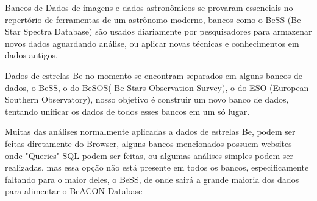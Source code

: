 Bancos de Dados de imagens e dados astronômicos se provaram essenciais no repertório de ferramentas de um astrônomo moderno, bancos como o BeSS (Be Star Spectra Database) são usados diariamente por pesquisadores para armazenar novos dados aguardando análise, ou aplicar novas técnicas e conhecimentos em dados antigos.

Dados de estrelas Be no momento se encontram separados em alguns bancos de dados, o BeSS, o do BeSOS( Be Stars Observation Survey), o do ESO (European Southern Observatory), nosso objetivo é construir um novo banco de dados, tentando unificar os dados de todos esses bancos em um só lugar.

Muitas das análises normalmente aplicadas a dados de estrelas Be, podem ser feitas diretamente do Browser, alguns bancos mencionados possuem websites onde "Queries" SQL podem ser feitas, ou algumas análises simples podem ser realizadas, mas essa opção não está presente em todos os bancos, especificamente faltando para o maior deles, o BeSS, de onde sairá a grande maioria dos dados para alimentar o BeACON Database